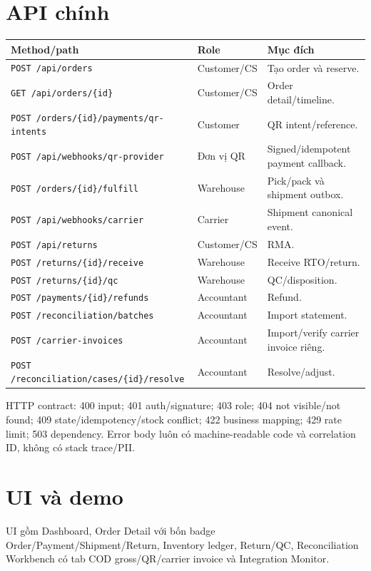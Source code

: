 \documentclass[12pt,a4paper]{report}
\newcommand{\code}[1]{\texttt{#1}}
\begin{document}
\section{API chính}
\begin{longtable}{p{}p{}p{}}
\toprule
\textbf{Method/path} & \textbf{Role} & \textbf{Mục đích}\\
\midrule\endhead
\code{POST /api/orders} & Customer/CS & Tạo order và reserve.\\
\code{GET /api/orders/\{id\}} & Customer/CS & Order detail/timeline.\\
\code{POST /orders/\{id\}/payments/qr-intents} & Customer & QR intent/reference.\\
\code{POST /api/webhooks/qr-provider} & Đơn vị QR & Signed/idempotent payment callback.\\
\code{POST /orders/\{id\}/fulfill} & Warehouse & Pick/pack và shipment outbox.\\
\code{POST /api/webhooks/carrier} & Carrier & Shipment canonical event.\\
\code{POST /api/returns} & Customer/CS & RMA.\\
\code{POST /returns/\{id\}/receive} & Warehouse & Receive RTO/return.\\
\code{POST /returns/\{id\}/qc} & Warehouse & QC/disposition.\\
\code{POST /payments/\{id\}/refunds} & Accountant & Refund.\\
\code{POST /reconciliation/batches} & Accountant & Import statement.\\
\code{POST /carrier-invoices} & Accountant & Import/verify carrier invoice riêng.\\
\code{POST /reconciliation/cases/\{id\}/resolve} & Accountant & Resolve/adjust.\\
\bottomrule
\end{longtable}

HTTP contract: 400 input; 401 auth/signature; 403 role; 404 not visible/not found; 409 state/idempotency/stock conflict; 422 business mapping; 429 rate limit; 503 dependency. Error body luôn có machine-readable code và correlation ID, không có stack trace/PII.

\section{UI và demo}
UI gồm Dashboard, Order Detail với bốn badge Order/Payment/Shipment/Return, Inventory ledger, Return/QC, Reconciliation Workbench có tab COD gross/QR/carrier invoice và Integration Monitor.
\end{document}
